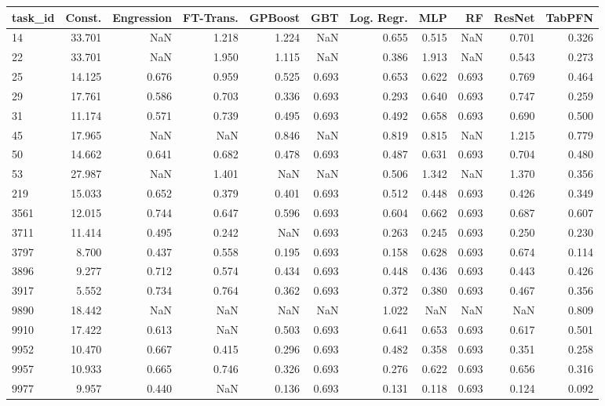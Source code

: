 \begin{tabular}{lrrrrrrrrrr}
\toprule
task\_id & Const. & Engression & FT-Trans. & GPBoost & GBT & Log. Regr. & MLP & RF & ResNet & TabPFN \\
\midrule
14 & 33.701 & NaN & 1.218 & 1.224 & NaN & 0.655 & 0.515 & NaN & 0.701 & 0.326 \\
22 & 33.701 & NaN & 1.950 & 1.115 & NaN & 0.386 & 1.913 & NaN & 0.543 & 0.273 \\
25 & 14.125 & 0.676 & 0.959 & 0.525 & 0.693 & 0.653 & 0.622 & 0.693 & 0.769 & 0.464 \\
29 & 17.761 & 0.586 & 0.703 & 0.336 & 0.693 & 0.293 & 0.640 & 0.693 & 0.747 & 0.259 \\
31 & 11.174 & 0.571 & 0.739 & 0.495 & 0.693 & 0.492 & 0.658 & 0.693 & 0.690 & 0.500 \\
45 & 17.965 & NaN & NaN & 0.846 & NaN & 0.819 & 0.815 & NaN & 1.215 & 0.779 \\
50 & 14.662 & 0.641 & 0.682 & 0.478 & 0.693 & 0.487 & 0.631 & 0.693 & 0.704 & 0.480 \\
53 & 27.987 & NaN & 1.401 & NaN & NaN & 0.506 & 1.342 & NaN & 1.370 & 0.356 \\
219 & 15.033 & 0.652 & 0.379 & 0.401 & 0.693 & 0.512 & 0.448 & 0.693 & 0.426 & 0.349 \\
3561 & 12.015 & 0.744 & 0.647 & 0.596 & 0.693 & 0.604 & 0.662 & 0.693 & 0.687 & 0.607 \\
3711 & 11.414 & 0.495 & 0.242 & NaN & 0.693 & 0.263 & 0.245 & 0.693 & 0.250 & 0.230 \\
3797 & 8.700 & 0.437 & 0.558 & 0.195 & 0.693 & 0.158 & 0.628 & 0.693 & 0.674 & 0.114 \\
3896 & 9.277 & 0.712 & 0.574 & 0.434 & 0.693 & 0.448 & 0.436 & 0.693 & 0.443 & 0.426 \\
3917 & 5.552 & 0.734 & 0.764 & 0.362 & 0.693 & 0.372 & 0.380 & 0.693 & 0.467 & 0.356 \\
9890 & 18.442 & NaN & NaN & NaN & NaN & 1.022 & NaN & NaN & NaN & 0.809 \\
9910 & 17.422 & 0.613 & NaN & 0.503 & 0.693 & 0.641 & 0.653 & 0.693 & 0.617 & 0.501 \\
9952 & 10.470 & 0.667 & 0.415 & 0.296 & 0.693 & 0.482 & 0.358 & 0.693 & 0.351 & 0.258 \\
9957 & 10.933 & 0.665 & 0.746 & 0.326 & 0.693 & 0.276 & 0.622 & 0.693 & 0.656 & 0.316 \\
9977 & 9.957 & 0.440 & NaN & 0.136 & 0.693 & 0.131 & 0.118 & 0.693 & 0.124 & 0.092 \\

\end{tabular}
